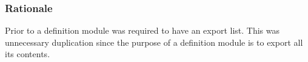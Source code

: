 \documentclass[10pt,a4paper]{article}
\begin{document}
\subsubsection{Rationale}
Prior to \cite{Wirth85} a definition module was required to have an export
list. This was unnecessary duplication since the purpose of a definition
module is to export all its contents. 



\printglossary[title=Definitions, toctitle=Definitions]




\end{document}
